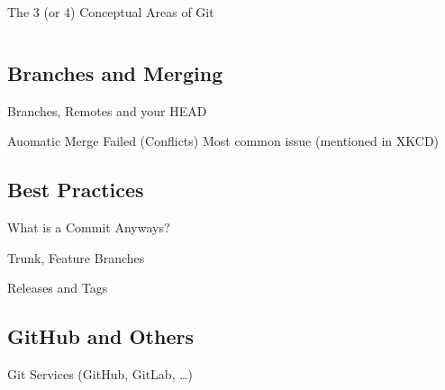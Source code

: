 \documentclass[xetex, handout]{beamer}
\begin{document}
\begin{frame}[fragile]{The 3 (or 4) Conceptual Areas of Git}
\begin{columns}
\begin{column}{.95\paperwidth}
    \end{column}
  \end{columns}
\end{frame}

\subsection{Branches and Merging}

\begin{frame}{Branches, Remotes and your HEAD}
\end{frame}

\begin{frame}{Auomatic Merge Failed (Conflicts)}
  Most common issue (mentioned in XKCD)
\end{frame}

\subsection{Best Practices}

\begin{frame}{What is a Commit Anyways?}
\end{frame}

\begin{frame}{Trunk, Feature Branches}
\end{frame}

\begin{frame}{Releases and Tags}
\end{frame}

\subsection{GitHub and Others}

\begin{frame}{Git Services (GitHub, GitLab, \ldots)}
\end{frame}
\end{document}
